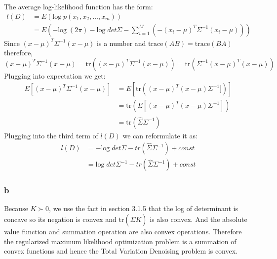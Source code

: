 \documentclass[10pt,a4paper]{article}
\begin{document}
The average log-likelihood function has the form:
\begin{align*}
  l(D) & = E(\text{log}\;p(x_1,x_2,\dots,x_m))\\
       & = E(-\text{log}\;(2\pi) - \text{log}\;det\Sigma
  - \sum_{i=1}^{M}(-(x_i-\mu)^T\Sigma^{-1}(x_i-\mu)))
\end{align*}
Since $(x-\mu)^T\Sigma^{-1}(x-\mu)$ is a number and
$\mathrm{trace}(AB)=\mathrm{trace}(BA)$ therefore,
$$(x-\mu)^T\Sigma^{-1}(x-\mu)= \mathrm{tr}((x-\mu)^T\Sigma^{-1}(x-\mu))=\mathrm{tr}(\Sigma^{-1}(x-\mu)^T(x-\mu))$$ 
Plugging into expectation we get:
\begin{align*}
E[(x-\mu)^T\Sigma^{-1}(x-\mu)] &= E[\mathrm{tr}((x-\mu)^T(x-\mu)\Sigma^{-1}] )] \\
&= \mathrm{tr}(E[(x-\mu)^T(x-\mu)\Sigma^{-1}])\\
&= \mathrm{tr}(\hat{\Sigma}\Sigma^{-1})
\end{align*}
Plugging into the third term of $l(D)$ we can reformulate it as:
\begin{align*}
     l(D) &=- \text{log}\;det\Sigma - tr(\hat{\Sigma}\Sigma^{-1} )+ const \\
       & = \text{log}\;det\Sigma^{-1} - tr(\hat{\Sigma}\Sigma^{-1} ) + const 
\end{align*}

\subsubsection{b}
Because $K\succ 0$, we use the fact in section
3.1.5\cite{boyd2004convex} that the log of determinant is
concave so its negation is convex and
$\mathrm{tr}(\hat{\Sigma}K)$ is also convex. And the
absolute value function and summation operation are also
convex operations. Therefore the regularized maximum
likelihood optimization problem is a summation of convex
functions and hence the Total Variation Denoising problem is
convex.
\end{document}
